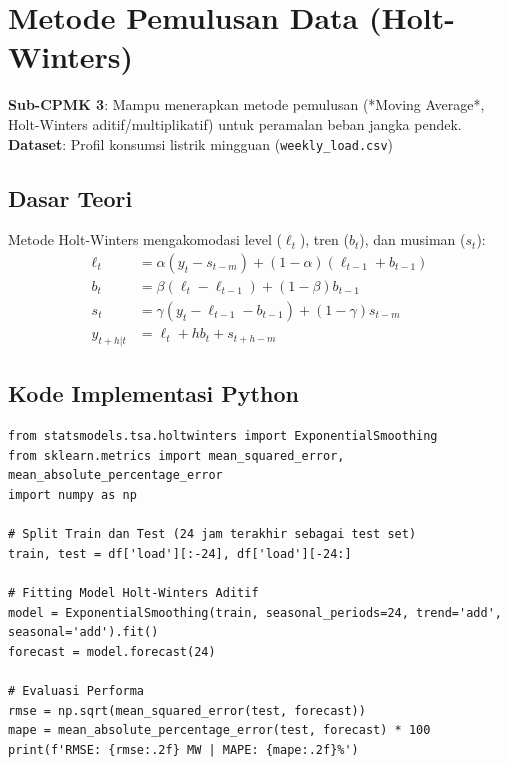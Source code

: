 \documentclass[11pt,a4paper]{report}
\begin{document}
\newpage

\chapter{Metode Pemulusan Data (Holt-Winters)}

\begin{tcolorbox}[title=Informasi Modul 3]
\textbf{Sub-CPMK 3}: Mampu menerapkan metode pemulusan (*Moving Average*, Holt-Winters aditif/multiplikatif) untuk peramalan beban jangka pendek.\\
\textbf{Dataset}: Profil konsumsi listrik mingguan (\texttt{weekly\_load.csv})
\end{tcolorbox}

\section{Dasar Teori}
Metode Holt-Winters mengakomodasi level ($\ell_t$), tren ($b_t$), dan musiman ($s_t$):
\begin{align}
    \ell_t &= \alpha (y_t - s_{t-m}) + (1 - \alpha)(\ell_{t-1} + b_{t-1}) \\
    b_t &= \beta (\ell_t - \ell_{t-1}) + (1 - \beta) b_{t-1} \\
    s_t &= \gamma (y_t - \ell_{t-1} - b_{t-1}) + (1 - \gamma) s_{t-m} \\
    \hat{y}_{t+h|t} &= \ell_t + h b_t + s_{t+h-m}
\end{align}

\section{Kode Implementasi Python}
\begin{lstlisting}
from statsmodels.tsa.holtwinters import ExponentialSmoothing
from sklearn.metrics import mean_squared_error, mean_absolute_percentage_error
import numpy as np

# Split Train dan Test (24 jam terakhir sebagai test set)
train, test = df['load'][:-24], df['load'][-24:]

# Fitting Model Holt-Winters Aditif
model = ExponentialSmoothing(train, seasonal_periods=24, trend='add', seasonal='add').fit()
forecast = model.forecast(24)

# Evaluasi Performa
rmse = np.sqrt(mean_squared_error(test, forecast))
mape = mean_absolute_percentage_error(test, forecast) * 100
print(f'RMSE: {rmse:.2f} MW | MAPE: {mape:.2f}%')
\end{lstlisting}
\end{document}
